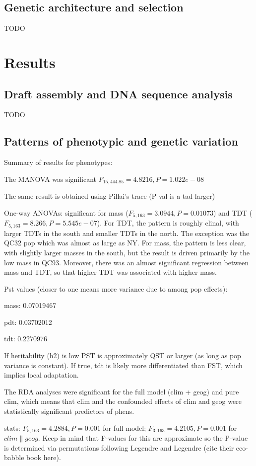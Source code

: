 \documentclass[fleqn,11pt]{wlpeerj}
\begin{document}
\subsection*{Genetic architecture and selection}
TODO

\section*{Results}

\subsection*{Draft assembly and DNA sequence analysis}
TODO

\subsection*{Patterns of phenotypic and genetic variation}
Summary of results for phenotypes:

The MANOVA was significant $F_{15,444.85} = 4.8216, P = 1.022e-08$

The same result is obtained using Pillai's trace (P val is a tad larger)

One-way ANOVAs: significant for mass ($F_{5,163} = 3.0944, P = 0.01073$)
and TDT ($F_{5,163} = 8.266, P = 5.545e-07$). For TDT, the pattern is
roughly clinal, with larger TDTs in the south and smaller TDTs in the north.
The exception was the QC32 pop which was almost as large as NY.
For mass, the pattern is less clear, with slightly larger masses in the south,
but the result is driven primarily by the low mass in QC93. Moreover, there was
an almost significant regression between mass and TDT, so
that higher TDT was associated with higher mass.

Pst values (closer to one means more variance due to among pop effects):

mass: 0.07019467

pdt: 0.03702012

tdt: 0.2270976

If heritability (h2) is low PST is approximately QST or larger (as long as pop variance is constant).
If true, tdt is likely more differentiated than FST, which implies local adaptation.

The RDA analyses were significant for the full model (clim + geog) and pure clim,
which means that clim and the confounded effects of clim and geog were statistically
significant predictors of phens.

stats: $F_{5,163} = 4.2884, P = 0.001$ for full model; $F_{3,163} = 4.2105, P = 0.001$ for $clim\|geog$.
Keep in mind that F-values for this are approximate so the P-value is determined via permutations
following Legendre and Legendre (cite their eco-babble book here).
\end{document}
